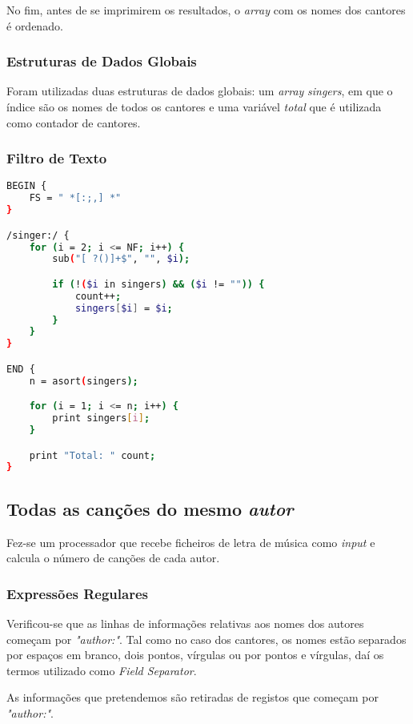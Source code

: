 \documentclass{article}
\begin{document}
No fim, antes de se imprimirem os resultados, o \emph{array} com os nomes dos cantores é ordenado.

\subsubsection{Estruturas de Dados Globais}

Foram utilizadas duas estruturas de dados globais: um \emph{array} \emph{singers}, em que o índice são os nomes de todos os cantores e uma variável \emph{total} que é utilizada como contador de cantores.

\subsubsection{Filtro de Texto}

\begin{lstlisting}[language=bash]
BEGIN {
	FS = " *[:;,] *"
}

/singer:/ {
	for (i = 2; i <= NF; i++) {
	    sub("[ ?()]+$", "", $i);

	    if (!($i in singers) && ($i != "")) {
	    	count++;
	    	singers[$i] = $i;
	    }
	}
}

END {
	n = asort(singers);

	for (i = 1; i <= n; i++) {
		print singers[i];
	}

	print "Total: " count;
}
\end{lstlisting}


\subsection{Todas as canções do mesmo \emph{autor}}

Fez-se um processador que recebe ficheiros de letra de música como \emph{input} e calcula o número de canções de cada autor.

\subsubsection{Expressões Regulares}

Verificou-se que as linhas de informações relativas aos nomes dos autores começam por \emph{"author:"}. Tal como no caso dos cantores, os nomes estão separados por espaços em branco, dois pontos, vírgulas ou por pontos e vírgulas, daí os termos utilizado como \emph{Field Separator}.

As informações que pretendemos são retiradas de registos que começam por \emph{"author:"}.
\end{document}
